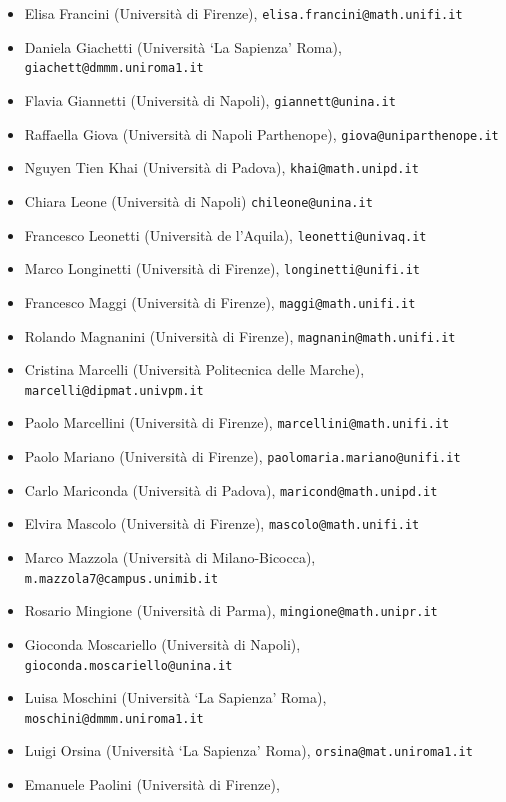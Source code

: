 \documentclass[12pt]{article}
\begin{document}
\begin{itemize}
{\tt mara.formica@uniparthenope.it} 
\item[]Elisa Francini  (Universit\`a di Firenze), 
{\tt elisa.francini@math.unifi.it} 
\item[]Daniela Giachetti (Universit\`a `La Sapienza' Roma), 
{\tt giachett@dmmm.uniroma1.it}
\item[]Flavia Giannetti  (Universit\`a di Napoli), 
{\tt giannett@unina.it} 
\item[]Raffaella Giova (Universit\`a di Napoli Parthenope), 
{\tt giova@uniparthenope.it} 
\item[]Nguyen Tien Khai (Universit\`a di Padova), 
{\tt khai@math.unipd.it} 
\item[]Chiara Leone  (Universit\`a di Napoli) 
{\tt chileone@unina.it} 
\item[]Francesco Leonetti (Universit\`a de l'Aquila), 
{\tt leonetti@univaq.it}  
\item[]Marco Longinetti  (Universit\`a di Firenze),  
{\tt longinetti@unifi.it}
\item[]Francesco Maggi  (Universit\`a di Firenze),  
{\tt maggi@math.unifi.it} 
\item[]Rolando Magnanini  (Universit\`a di Firenze),  
{\tt magnanin@math.unifi.it}
\item[]Cristina Marcelli (Universit\`a Politecnica delle Marche), 
{\tt marcelli@dipmat.univpm.it} 
\item[]Paolo Marcellini  (Universit\`a di Firenze), 
{\tt marcellini@math.unifi.it}
\item[]Paolo Mariano  (Universit\`a di Firenze), 
{\tt paolomaria.mariano@unifi.it} 
\item[]Carlo Mariconda (Universit\`a di Padova), 
{\tt maricond@math.unipd.it} 
\item[]Elvira Mascolo  (Universit\`a di Firenze), 
{\tt mascolo@math.unifi.it}
\item[]Marco Mazzola (Universit\`a di Milano-Bicocca), 
{\tt m.mazzola7@campus.unimib.it} 
\item[]Rosario Mingione (Universit\`a di Parma), 
{\tt mingione@math.unipr.it} 
\item[]Gioconda Moscariello  (Universit\`a di Napoli),
{\tt gioconda.moscariello@unina.it} 
\item[]Luisa Moschini (Universit\`a `La Sapienza' Roma), 
{\tt moschini@dmmm.uniroma1.it} 
\item[]Luigi Orsina (Universit\`a `La Sapienza' Roma), 
{\tt orsina@mat.uniroma1.it} 
\item[]Emanuele Paolini  (Universit\`a di Firenze), 

\end{itemize}
\end{document}
